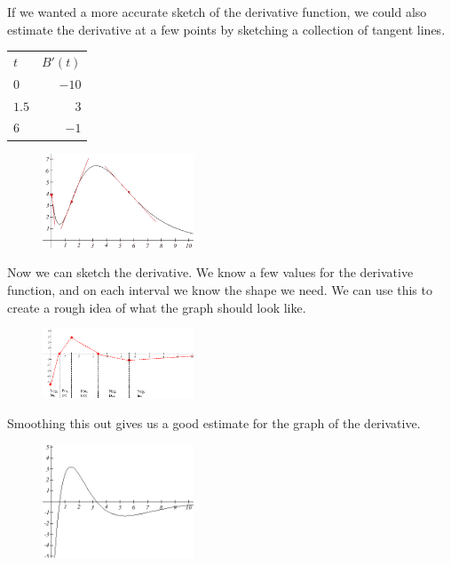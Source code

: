 \begin{example}
\begin{solution}
If we wanted a more accurate sketch of the derivative function, we could also estimate the derivative at a few points by sketching a collection of tangent lines.
\begin{table}[!ht]
    \centering
    \begin{tabular}{lr}
    \toprule 
    $t$     & $B'(t)$\\
    $0$     & $-10$ \\	
    $1.5$	& $3$	\\
    $6$     & $-1$ \\
    \bottomrule
    \end{tabular}
\end{table}
\begin{figure}[!ht]
  \centering
    \includegraphics[width=0.4\textwidth]{img/chap3/image079.png}
\end{figure}

Now we can sketch the derivative. We know a few values for the derivative function, and on each interval we know the shape we need. We can use this to create a rough idea of what the graph should look like.
\begin{figure}[!ht]
  \centering
    \includegraphics[width=0.4\textwidth]{img/chap3/image080.png}
\end{figure}

Smoothing this out gives us a good estimate for the graph of the derivative.
\begin{figure}[!ht]
  \centering
    \includegraphics[width=0.4\textwidth]{img/chap3/image081.png}
\end{figure}

\end{solution}\end{example}
